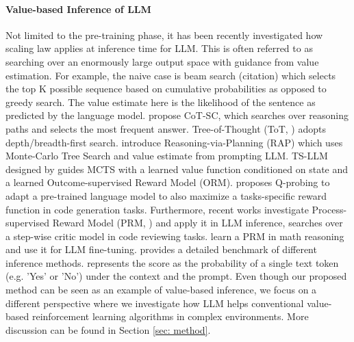 \paragraph{Value-based Inference of LLM} Not limited to the pre-training phase, it has been recently investigated how scaling law applies at inference time for LLM. This is often referred to as searching over an enormously large output space with guidance from value estimation. For example, the naive case is beam search (citation) which selects the top K possible sequence based on cumulative probabilities as opposed to greedy search. The value estimate here is the likelihood of the sentence as predicted by the language model. \citep{wang2022self} propose CoT-SC, which searches over reasoning paths and selects the most frequent answer. Tree-of-Thought (ToT, \citep{yao2023tree}) adopts depth/breadth-first search. \citep{hao2023reasoning} introduce Reasoning-via-Planning (RAP) which uses Monte-Carlo Tree Search and value estimate from prompting LLM. TS-LLM designed by \citep{feng2023alphazero} guides MCTS with a learned value function conditioned on state and a learned Outcome-supervised Reward Model (ORM). \citep{li2024q} proposes Q-probing to adapt a pre-trained language model to also maximize a tasks-specific reward function in code generation tasks. Furthermore, recent works investigate Process-supervised Reward Model (PRM, \citep{lightman2023let}) and apply it in LLM inference, \citep{mcaleese2024llm} searches over a step-wise critic model in code reviewing tasks. \citep{wang2024math} learn a PRM in math reasoning and use it for LLM fine-tuning. \citep{snell2024scaling} provides a detailed benchmark of different inference methods. \citep{zhang2024generative} represents the score as the probability of a single text token (e.g. 'Yes' or 'No') under the context and the prompt. Even though our proposed method can be seen as an example of value-based inference, we focus on a different perspective where we investigate how LLM helps conventional value-based reinforcement learning algorithms in complex environments. More discussion can be found in Section \ref{sec: method}.

